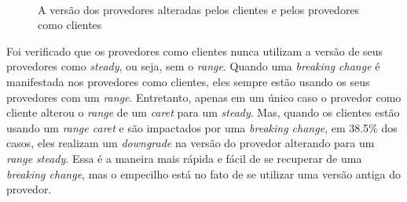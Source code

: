 \begin {figure} [h!]
   \centering
   \mbox {
        \quad
    }
    \caption{A versão dos provedores alteradas pelos clientes e pelos provedores como clientes}
    \label{fig:semver_both}
\end{figure}

Foi verificado que os provedores como clientes nunca utilizam a versão de seus provedores como \textit{steady}, ou seja, sem o \textit{range}. Quando uma \textit{breaking change} é manifestada nos provedores como clientes, eles sempre estão usando os seus provedores com um \textit{range}. Entretanto, apenas em um único caso o provedor como cliente alterou o \textit{range} de um \textit{caret} para um \textit{steady}. Mas, quando os clientes estão usando um \textit{range caret} e são impactados por uma \textit{breaking change}, em 38.5\% dos casos, eles realizam um \textit{downgrade} na versão do provedor alterando para um \textit{range steady}. Essa é a maneira mais rápida e fácil de se recuperar de uma \textit{breaking change}, mas o empecilho está no fato de se utilizar uma versão antiga do provedor.

